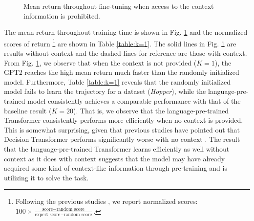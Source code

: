 \begin{figure}[h]
\begin{minipage}[b]{0.32\linewidth}
    \end{minipage}
    \caption{Mean return throughout fine-tuning when access to the context information is prohibited.}
    \label{fig:return-mean}
\end{figure}

\begin{table}
  \caption{Normalized return of $K = 1$.}
  \label{table:k=1}
  \centering
\end{table}

The mean return throughout training time is shown in Fig. \ref{fig:return-mean} and the normalized scores of return 
\footnote{
Following the previous studies \cite{fu2020d4rl,chen2021decision,reid2022can}, we report normalized scores: $100 \times \frac{\text{score} - \text{random score}}{\text{expert score} - \text{random score}}$.
} are shown in Table \ref{table:k=1}. The solid lines in Fig. \ref{fig:return-mean} are results without context and the dashed lines for reference are those with context. From Fig. \ref{fig:return-mean}, we observe that when the context is not provided ($K=1$), the GPT2 reaches the high mean return much faster than the randomly initialized model. Furthermore, Table \ref{table:k=1} reveals that the randomly initialized model fails to learn the trajectory for a dataset (\textit{Hopper}), while the language-pre-trained model consistently achieves a comparable performance with that of the baseline result ($K=20$). That is, we observe that the language-pre-trained Transformer consistently performs more efficiently when no context is provided. This is somewhat surprising, given that previous studies have pointed out that Decision Transformer performs significantly worse with no context \cite{chen2021decision}. The result that the language-pre-trained Transformer learns efficiently as well without context as it does with context suggests that the model may have already acquired some kind of context-like information through pre-training and is utilizing it to solve the task. 

